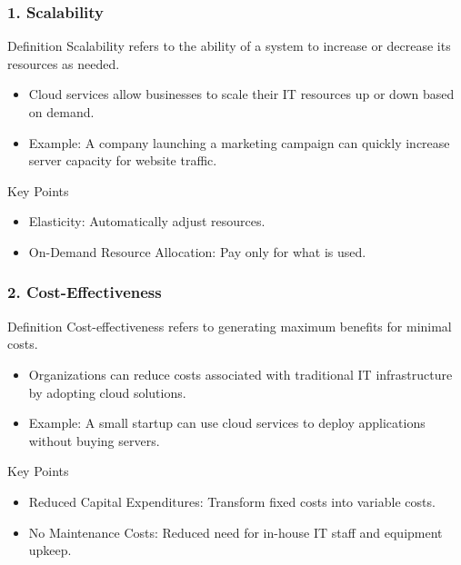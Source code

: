 \documentclass[aspectratio=169]{beamer}
\begin{document}
\begin{frame}[fragile]
    \frametitle{1. Scalability}
    \begin{block}{Definition}
        Scalability refers to the ability of a system to increase or decrease its resources as needed.
    \end{block}
    
    \begin{itemize}
        \item Cloud services allow businesses to scale their IT resources up or down based on demand.
        \item Example: A company launching a marketing campaign can quickly increase server capacity for website traffic.
    \end{itemize}

    \begin{block}{Key Points}
        \begin{itemize}
            \item Elasticity: Automatically adjust resources.
            \item On-Demand Resource Allocation: Pay only for what is used.
        \end{itemize}
    \end{block}
\end{frame}

\begin{frame}[fragile]
    \frametitle{2. Cost-Effectiveness}
    \begin{block}{Definition}
        Cost-effectiveness refers to generating maximum benefits for minimal costs.
    \end{block}
    
    \begin{itemize}
        \item Organizations can reduce costs associated with traditional IT infrastructure by adopting cloud solutions.
        \item Example: A small startup can use cloud services to deploy applications without buying servers.
    \end{itemize}

    \begin{block}{Key Points}
        \begin{itemize}
            \item Reduced Capital Expenditures: Transform fixed costs into variable costs.
            \item No Maintenance Costs: Reduced need for in-house IT staff and equipment upkeep.
        \end{itemize}
    \end{block}
\end{frame}
\end{document}
